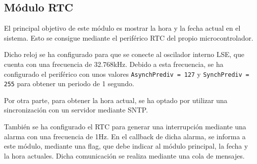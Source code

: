 \subsection{Módulo RTC}
El principal objetivo de este módulo es mostrar la hora y la fecha actual en el sistema. Esto se consigue mediante el periférico RTC del propio microcontrolador.

Dicho reloj se ha configurado para que se conecte al oscilador interno LSE, que cuenta con una frecuencia de 32.768kHz. Debido a esta frecuencia, se ha configurado el periférico con unos valores \texttt{AsynchPrediv = 127} y \texttt{SynchPrediv = 255} para obtener un periodo de 1 segundo.

Por otra parte, para obtener la hora actual, se ha optado por utilizar una sincronización con un servidor mediante SNTP.

También se ha configurado el RTC para generar una interrupción mediante una alarma con una frecuencia de 1Hz. En el callback de dicha alarma, se informa a este módulo, mediante una flag, que debe indicar al módulo principal, la fecha y la hora actuales. Dicha comunicación se realiza mediante una cola de mensajes.